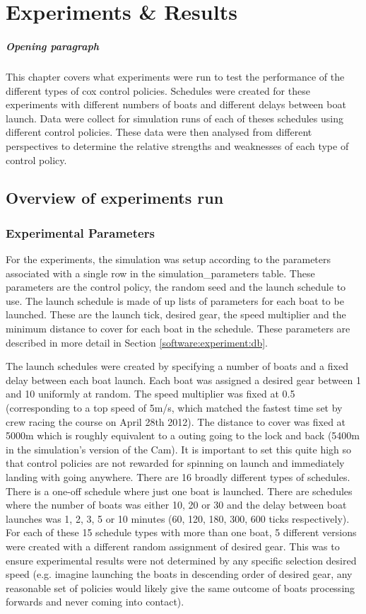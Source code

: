 \chapter{Experiments \& Results}
\paragraph{Opening paragraph}
This chapter covers what experiments were run to test the performance of the different types of cox control policies. Schedules were created for these experiments with different numbers of boats and different delays between boat launch. Data were collect for simulation runs of each of theses schedules using different control policies. These data were then analysed from different perspectives to determine the relative strengths and weaknesses of each type of control policy.

\section{Overview of experiments run}
  
  \subsection{Experimental Parameters}
  For the experiments, the simulation was setup according to the
  parameters associated with a single row in the
  simulation\_parameters table. These parameters are the control
  policy, the random seed and the launch schedule to use. The launch
  schedule is made of up lists of parameters for each boat to be
  launched. These are the launch tick, desired gear, the speed
  multiplier and the minimum distance to cover for each boat in the
  schedule. These parameters are described in more detail in Section \ref{software:experiment:db}.
  
  The launch schedules were created by specifying a number of boats
  and a fixed delay between each boat launch. Each boat was assigned a
  desired gear between 1 and 10 uniformly at random. The speed
  multiplier was fixed at 0.5 (corresponding to a top speed of 5m/s,
  which matched the fastest time set by crew racing the course on
  April 28th 2012). The distance to cover was fixed at 5000m which is
  roughly equivalent to a outing going to the lock and back (5400m in
  the simulation's version of the Cam). It is important to set this
  quite high so that control policies are not rewarded for spinning on
  launch and immediately landing with going anywhere. There are 16 broadly different types of schedules. There is a one-off schedule where just one boat is launched. There are schedules where the number of boats was either 10, 20 or 30 and the delay between boat launches was 1, 2, 3, 5 or 10 minutes (60, 120, 180, 300, 600 ticks respectively).  For each of these 15 schedule types with more than one boat, 5 different versions were created with a different random assignment of desired gear. This was to ensure experimental results were not determined by any specific selection desired speed (e.g. imagine launching the boats in descending order of desired gear, any reasonable set of policies would likely give the same outcome of boats processing forwards and never coming into contact).
  
